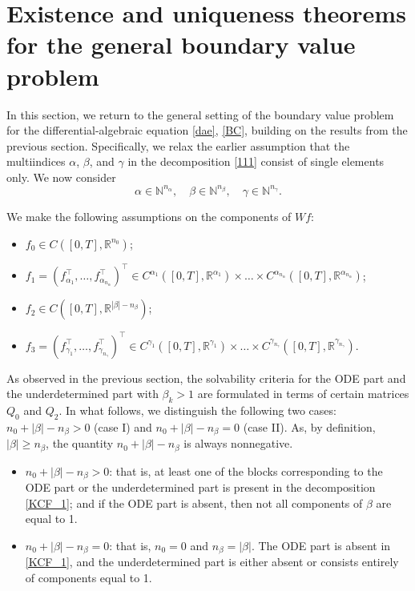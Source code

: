 \documentclass[preprint,12pt]{elsarticle}
\numberwithin{equation}{section}
\theoremstyle{definition}
\begin{document}
\section{Existence and uniqueness theorems for the general boundary value problem}

In this section, we return to the general setting of the boundary value problem for the differential-algebraic equation \eqref{dae}, \eqref{BC}, building on the results from the previous section. Specifically, we relax the earlier assumption that the multiindices \( \alpha \), \( \beta \), and \( \gamma \) in the decomposition \eqref{111} consist of single elements only. We now consider
\[
\alpha \in \mathbb{N}^{n_{\alpha}}, \quad \beta \in \mathbb{N}^{n_{\beta}}, \quad \gamma \in \mathbb{N}^{n_{\gamma}}.
\]

We make the following assumptions on the components of $Wf$:
\begin{itemize}
    \item[\textbf{(A0)}] \( f_0 \in C([0,T], \mathbb{R}^{n_0}) \);
    \item[\textbf{(A1)}] \( f_1 = \left(f_{\alpha_1}^\top, \ldots, f_{\alpha_{n_{\alpha}}}^\top\right)^\top \in C^{\alpha_1}([0,T], \mathbb{R}^{\alpha_1}) \times \ldots \times C^{\alpha_{n_{\alpha}}}([0,T], \mathbb{R}^{\alpha_{n_{\alpha}}}) \);
    \item[\textbf{(A2)}] \( f_2 \in C([0,T], \mathbb{R}^{|\beta| - n_{\beta}}) \);
    \item[\textbf{(A3)}] \( f_3 = \left(f_{\gamma_1}^\top, \ldots, f_{\gamma_{n_{\gamma}}}^\top\right)^\top \in C^{\gamma_1}([0,T], \mathbb{R}^{\gamma_1}) \times \ldots \times C^{\gamma_{n_{\gamma}}}([0,T], \mathbb{R}^{\gamma_{n_{\gamma}}}) \).
\end{itemize}

As observed in the previous section, the solvability criteria for the ODE part and the underdetermined part with \( \beta_k > 1 \) are formulated in terms of certain matrices \( Q_0 \) and \( Q_2 \). In what follows, we distinguish the following two cases:
$ n_0 + |\beta| - n_{\beta} > 0$ (case I) and $ n_0 + |\beta| - n_{\beta} = 0$ (case II). 
As, by definition,  $|\beta|\geq n_\beta$, the quantity $ n_0 + |\beta| - n_{\beta}$
is always nonnegative.

\begin{itemize}
    \item[I.] \( n_0 + |\beta| - n_{\beta} > 0 \): that is, at least one of the blocks corresponding to the ODE part or the underdetermined part is present in the decomposition \eqref{KCF_1}; and if the ODE part is absent, then not all components of \( \beta \) are equal to 1.
    
    \item[II.] \( n_0 + |\beta| - n_{\beta} = 0 \): that is, 
    $n_0=0$ and $n_{\beta} =|\beta|$.
    The ODE part is absent in \eqref{KCF_1}, and the underdetermined part is either absent or consists entirely of components equal to 1.
\end{itemize}
\end{document}
